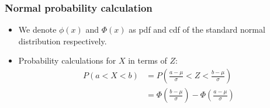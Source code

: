 \documentclass[slidestop,compress,mathserif]{beamer}
\begin{document}
\begin{frame}\frametitle{Normal probability calculation}
\begin{itemize}


\item We denote $\phi(x)$ and $\Phi(x)$ as pdf and cdf of the standard normal distribution respectively.
\pause
\item Probability calculations for $X$ in terms of $Z$:
\begin{align*}
P(a < X < b) %
&= P\left(\frac{a - \mu}{\sigma} < Z < \frac{b - \mu}{\sigma}\right) \\
& = \Phi\left(\frac{b - \mu}{\sigma}\right) - \Phi\left(\frac{a - \mu}{\sigma}\right)
\end{align*}


\end{itemize}
\end{frame}
\end{document}
